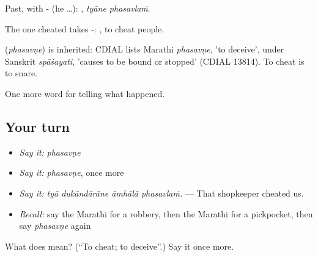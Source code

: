 Past, with - (he …):  , \emph{tyāne phasavlaṁ}.

The one cheated takes -:  , to cheat people.

\begin{cousinweb}
\textbf{} (\emph{phasavṇe}) is inherited: CDIAL lists Marathi \emph{phasavṇe}, 'to deceive', under Sanskrit \emph{spāśayati}, 'causes to be bound or stopped' (CDIAL 13814). To cheat is to snare.
\end{cousinweb}

\begin{grammarlens}[title={What you've built}]
One more word for telling what happened.
\end{grammarlens}

\subsection*{Your turn}
\begin{itemize}
\raggedright
  \item \emph{Say it:} \emph{phasavṇe}
  \item \emph{Say it:} \emph{phasavṇe}, once more
  \item \emph{Say it:} \emph{tyā dukāndārāne āmhālā phasavlaṁ.} — That shopkeeper cheated us.
  \item \emph{Recall:} say the Marathi for a robbery, then the Marathi for a pickpocket, then say \emph{phasavṇe} again
\end{itemize}

\begin{tcolorbox}[breakable,colback=teal!4,colframe=teal!35!black,title={Before you move on}]
What does  mean? (\textquotedblleft{}To cheat; to deceive\textquotedblright{}.) Say it once more.
\end{tcolorbox}

